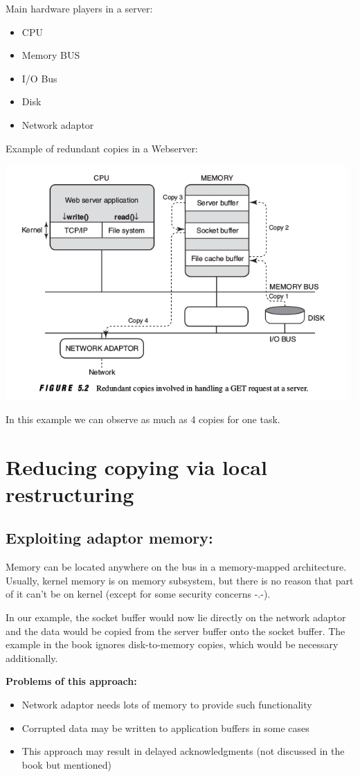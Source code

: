 Main hardware players in a server:

\begin{itemize}
    \item CPU
    \item Memory BUS
    \item I/O Bus
    \item Disk
    \item Network adaptor
\end{itemize}

Example of redundant copies in a Webserver:

\includegraphics[width=.7\textwidth]{images/chap5/Redundant_copies}

In this example we can observe as much as 4 copies for one task.

\section{Reducing copying via local restructuring}

\subsection{Exploiting adaptor memory:} 

Memory can be located anywhere on the bus in a memory-mapped architecture. Usually, kernel memory is on memory subsystem, but there is no reason that part of it can't be on kernel (except for some security concerns -.-).

In our example, the socket buffer would now lie directly on the network adaptor and the data would be copied from the server buffer onto the socket buffer. The example in the book ignores disk-to-memory copies, which would be necessary additionally.

\textbf{Problems of this approach:}

\begin{itemize}
\item Network adaptor needs lots of memory to provide such functionality
\item Corrupted data may be written to application buffers in some cases
\item This approach may result in delayed acknowledgments (not discussed in the book but mentioned)
\end{itemize}

